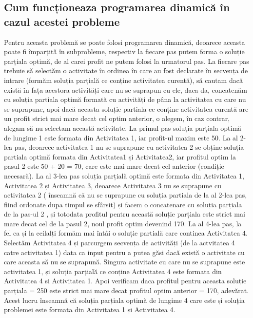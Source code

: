 \subsection{Cum funcționeaza programarea dinamică în cazul acestei probleme}
Pentru aceasta problemă se poate folosi programarea dinamică, deoarece aceasta poate fi împarțită în subprobleme, respectiv la fiecare pas putem forma o soluție parțiala optimă, de al carei profit ne putem folosi la urmatorul pas. 
La fiecare pas trebuie să selectăm o activitate în ordinea în care au fost declarate în secvența de intrare (formăm soluția parțială ce conține activitatea curentă), să cautam dacă există în fața acestora activități care nu se suprapun cu ele, daca da, concatenăm cu soluția partiala optimă
formată cu activități de pâna la activitatea cu care nu se suprapune, apoi dacă aceasta soluție partiala ce conține activitatea curentă are un profit strict mai mare decat cel optim anterior, o alegem, în caz contrar, alegam să nu selectam această activitate. 
La primul pas soluția parțiala optimă de lungime 1 este formata din Activitatea 1, iar profit-ul maxim este 50. 
La al 2-lea pas, deoarece activitatea 1 nu se suprapune cu activitatea 2 se obține soluția partiala optimă formata din Activitatea1 și Activitatea2, iar profitul optim la pasul 2 este 50 + 20 = 70, care este mai mare decat cel anterior (condiție necesară). 
La al 3-lea pas soluția parțială optimă este formata din Activitatea 1, Activitatea 2 și Activitatea 3, deoarece Activitatea 3 nu se suprapune cu activitatea 2 ( înseamnă că nu se suprapune cu soluția partiala de la al 2-lea pas, fiind ordonate dupa timpul se sfârsit) și facem o concatenare cu soluția parțiala de la pas-ul 2 , și totodata profitul pentru această soluție parțiala este strict mai mare decat cel de la pasul 2, noul profit optim devenind 170. 
La al 4-lea pas, la fel ca și la ceilalți formăm mai întâi o soluție partială care continea Activitatea 4. Selectăm Activitatea 4 și parcurgem secvența de activități (de la actvitatea 4 catre activitatea 1) data ca input pentru a putea găsi dacă există o activitate cu care aceasta să nu se suprapună. Singura activitate cu care nu se suprapune este activitatea 1, și soluția parțială ce conține Activitatea 4 este formata din Activitatea 4 si Activitatea 1. Apoi verificam daca profitul pentru aceasta soluție parțiala = 250 este strict mai mare decat profitul optim anterior = 170, adevărat. Acest lucru înseamnă că soluția parțiala optimă de lungime 4 care este și soluția problemei este formata din Activitatea 1 și Activitatea 4. 


